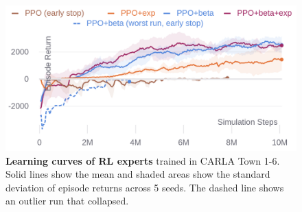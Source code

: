 \begin{figure}[t]
	\begin{center}
		\includegraphics[width=\linewidth]{img/rl.png}
	\end{center}
	\vspace{-4ex}
	\caption{\textbf{Learning curves of RL experts }
		trained in CARLA Town 1-6.
		Solid lines show the mean and shaded areas show the standard deviation of episode returns across 5 seeds.
		The dashed line shows an outlier run that collapsed.}
	\vspace{-2ex}
	\label{fig:rl}
\end{figure}






